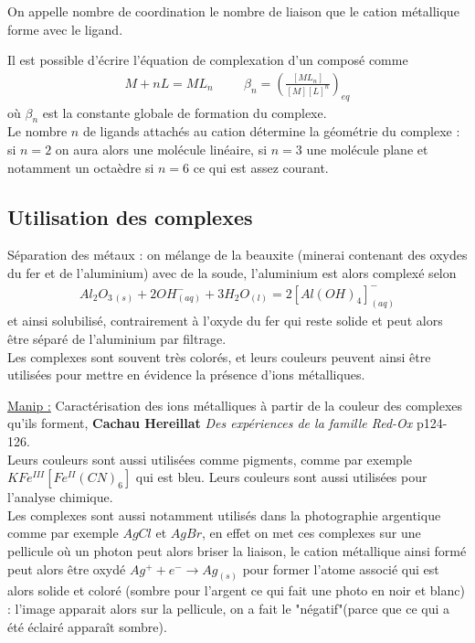 \documentclass[12pt,prb,aps,epsf]{article}
\begin{document}
On appelle nombre de coordination le nombre de liaison que le cation métallique forme avec le ligand.

Il est possible d'écrire l'équation de complexation d'un composé comme
\begin{eqnarray}
M+nL = ML_n\hspace{1cm}  \beta_n = \left(\frac{[ML_n]}{[M][L]^n}\right)_{eq}
\end{eqnarray}
où $\beta_n$ est la constante globale de formation du complexe.\\

Le nombre $n$ de ligands attachés au cation détermine la géométrie du complexe : si $n=2$ on aura alors une molécule linéaire, si $n=3$ une molécule plane et notamment un octaèdre si $n=6$ ce qui est assez courant.

\subsection{Utilisation des complexes}
Séparation des métaux : on mélange de la beauxite (minerai contenant des oxydes du fer et de l'aluminium) avec de la soude, l'aluminium est alors complexé selon 
\begin{eqnarray}
Al_2O_{3\,(s)}  + 2OH^{-}_{(aq)} + 3H_2O_{(l)} =  2[Al(OH)_4]^-_{(aq)}
\end{eqnarray}
et ainsi solubilisé, contrairement à l'oxyde du fer qui reste solide et peut alors être séparé de l'aluminium par filtrage.\\

Les complexes sont souvent très colorés, et leurs couleurs peuvent ainsi être utilisées pour mettre en évidence la présence d'ions métalliques.

\underline{Manip :} Caractérisation des ions métalliques à partir de la couleur des complexes qu'ils forment, \textbf{Cachau Hereillat} \textit{Des expériences de la famille Red-Ox} p124-126.\\

Leurs couleurs sont aussi utilisées comme pigments, comme par exemple $KFe^{III}[Fe^{II}(CN)_6]$ qui est bleu. Leurs couleurs sont aussi utilisées pour l'analyse chimique.\\
Les complexes sont aussi notamment utilisés dans la photographie argentique comme par exemple $AgCl$ et $AgBr$, en effet on met ces complexes sur une pellicule où un photon peut alors briser la liaison, le cation métallique ainsi formé peut alors être oxydé $Ag^++e^-\rightarrow Ag_{(s)}$ pour former l'atome associé qui est alors solide et coloré (sombre pour l'argent ce qui fait une photo en noir et blanc) : l'image apparait alors sur la pellicule, on a fait le "négatif"(parce que ce qui a été éclairé apparaît sombre).
\end{document}
